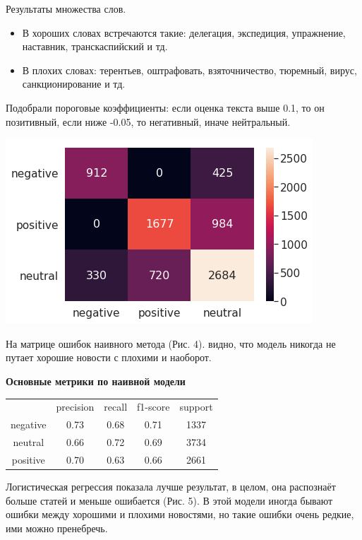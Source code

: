 \documentclass[12pt]{article}
\begin{document}
        Результаты множества слов.
        \begin{itemize}
            \item В хороших словах встречаются такие: делегация, экспедиция, упражнение, наставник, транскаспийский и тд.
            \item В плохих словах: терентьев, оштрафовать, взяточничество, тюремный, вирус, санкционирование и тд.
        \end{itemize}
        
        Подобрали пороговые коэффициенты: если оценка текста выше 0.1, то он позитивный,
        если ниже -0.05, то негативный, иначе нейтральный.

        \begin{center}
            \includegraphics[scale=0.8]{naive_heat}
        \end{center}

        На матрице ошибок наивного метода (Рис. 4). видно, что модель никогда не путает хорошие новости
        с плохими и наоборот.

        \textbf{Основные метрики по наивной модели}
        \begin{center}
            \begin{tabular}{ c c c c c}
             & precision & recall & f1-score & support\\ 
             negative & 0.73 & 0.68 & 0.71 & 1337\\ 
             neutral & 0.66 & 0.72 & 0.69 & 3734\\
             positive & 0.70 & 0.63 & 0.66 & 2661
            \end{tabular}
        \end{center}

        Логистическая регрессия показала лучше результат, в целом, она распознаёт больше
        статей и меньше ошибается (Рис. 5). В этой модели иногда бывают ошибки между хорошими и плохими 
        новостями, но такие ошибки очень редкие, ими можно пренебречь.
\end{document}

